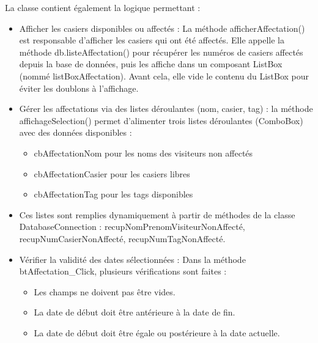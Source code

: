 \documentclass[main.tex]{subfiles}
\begin{document}
La classe contient également la logique permettant : 

\begin{itemize}

\item Afficher les casiers disponibles ou affectés : La méthode afficherAffectation() est responsable d'afficher les casiers qui ont été affectés. Elle appelle la méthode db.listeAffectation() pour récupérer les numéros de casiers affectés depuis la base de données, puis les affiche dans un composant ListBox (nommé listBoxAffectation). Avant cela, elle vide le contenu du ListBox pour éviter les doublons à l'affichage. 

\item Gérer les affectations via des listes déroulantes (nom, casier, tag) : la méthode affichageSelection() permet d’alimenter trois listes déroulantes (ComboBox) avec des données disponibles : 
\begin{itemize}

\item cbAffectationNom pour les noms des visiteurs non affectés 

\item cbAffectationCasier pour les casiers libres 

\item cbAffectationTag pour les tags disponibles 

\end{itemize}

\item Ces listes sont remplies dynamiquement à partir de méthodes de la classe DatabaseConnection : recupNomPrenomVisiteurNonAffecté, recupNumCasierNonAffecté, recupNumTagNonAffecté. 

\item Vérifier la validité des dates sélectionnées : Dans la méthode btAffectation\_Click, plusieurs vérifications sont faites : 

\begin{itemize}

\item Les champs ne doivent pas être vides. 

\item La date de début doit être antérieure à la date de fin. 

\item La date de début doit être égale ou postérieure à la date actuelle. 

\end{itemize}


\end{itemize}
\end{document}
